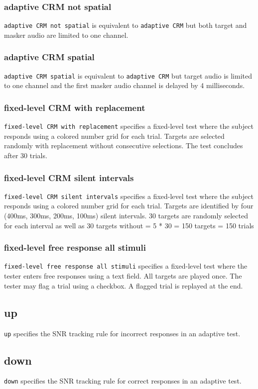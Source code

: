 \documentclass[11pt,pdftex,letterpaper]{article}
\begin{document}
\subsubsection{adaptive CRM not spatial}
\texttt{adaptive CRM not spatial} is equivalent to \texttt{adaptive CRM} but both target and masker audio are limited to one channel.
\subsubsection{adaptive CRM spatial}
\texttt{adaptive CRM spatial} is equivalent to \texttt{adaptive CRM} but target audio is limited to one channel and the first masker audio channel is delayed by 4 milliseconds.
\subsubsection{fixed-level CRM with replacement}
\texttt{fixed-level CRM with replacement} specifies a fixed-level test where the subject responds using a colored number grid for each trial. Targets are selected randomly with replacement without consecutive selections. The test concludes after 30 trials.
\subsubsection{fixed-level CRM silent intervals}
\texttt{fixed-level CRM silent intervals} specifies a fixed-level test where the subject responds using a colored number grid for each trial. Targets are identified by four (400ms, 300ms, 200ms, 100ms) silent intervals. 30 targets are randomly selected for each interval as well as 30 targets without = 5 * 30 = 150 targets = 150 trials
\subsubsection{fixed-level free response all stimuli}
\texttt{fixed-level free response all stimuli} specifies a fixed-level test where the tester enters free responses using a text field. All targets are played once. The tester may flag a trial using a checkbox. A flagged trial is replayed at the end.
\subsection{up}
\texttt{up} specifies the SNR tracking rule for incorrect responses in an adaptive test.
\subsection{down}
\texttt{down} specifies the SNR tracking rule for correct responses in an adaptive test.
\end{document}
